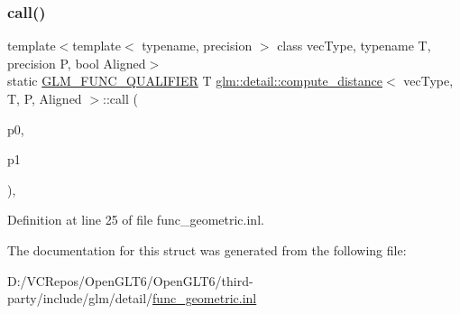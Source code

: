 \subsubsection{\texorpdfstring{call()}{call()}}
{\footnotesize\ttfamily template$<$template$<$ typename, precision $>$ class vec\+Type, typename T, precision P, bool Aligned$>$ \\
static \mbox{\hyperlink{setup_8hpp_a33fdea6f91c5f834105f7415e2a64407}{G\+L\+M\+\_\+\+F\+U\+N\+C\+\_\+\+Q\+U\+A\+L\+I\+F\+I\+ER}} T \mbox{\hyperlink{structglm_1_1detail_1_1compute__distance}{glm\+::detail\+::compute\+\_\+distance}}$<$ vec\+Type, T, P, Aligned $>$\+::call (\begin{DoxyParamCaption}\item[{vec\+Type$<$ T, P $>$ const \&}]{p0,  }\item[{vec\+Type$<$ T, P $>$ const \&}]{p1 }\end{DoxyParamCaption})\hspace{0.3cm}{\ttfamily [inline]}, {\ttfamily [static]}}



Definition at line 25 of file func\+\_\+geometric.\+inl.



The documentation for this struct was generated from the following file\+:\begin{DoxyCompactItemize}
\item 
D\+:/\+V\+C\+Repos/\+Open\+G\+L\+T6/\+Open\+G\+L\+T6/third-\/party/include/glm/detail/\mbox{\hyperlink{func__geometric_8inl}{func\+\_\+geometric.\+inl}}\end{DoxyCompactItemize}
